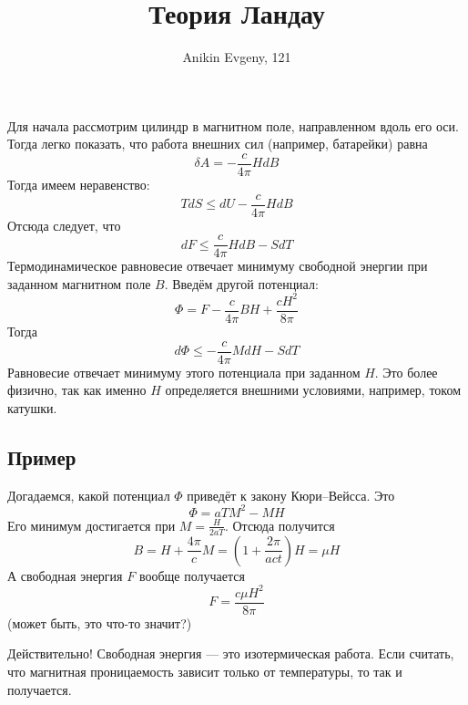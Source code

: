 \documentclass{article}
\title{Теория Ландау}
\author{Anikin Evgeny, 121}
\begin{document}
\maketitle
\section{}
Для начала рассмотрим цилиндр в магнитном поле, направленном вдоль его оси.
Тогда легко показать, что работа внешних сил (например, батарейки) равна
	\begin{equation}
		\delta A = -\frac{c}{4\pi} HdB
	\end{equation}
Тогда имеем неравенство:
	\begin{equation}
		TdS \le dU - \frac{c}{4\pi} HdB 
	\end{equation}
Отсюда следует, что
	\begin{equation}
		dF \le \frac{c}{4\pi} H dB - S dT
	\end{equation}
Термодинамическое равновесие отвечает минимуму свободной энергии при заданном магнитном поле
$B$.
Введём другой потенциал:
	\begin{equation}
		\Phi = F - \frac{c}{4\pi} BH + \frac{cH^2}{8\pi}
	\end{equation}
Тогда
	\begin{equation}
		d \Phi \le -\frac{c}{4\pi} MdH - SdT
	\end{equation}
Равновесие отвечает минимуму этого потенциала при заданном $H$. Это более физично, так как
именно $H$ определяется внешними условиями, например, током катушки.

\subsection{Пример}
Догадаемся, какой потенциал $\Phi$ приведёт к закону Кюри--Вейсса. Это
\begin{equation}
	\Phi = aTM^2 - MH
\end{equation}
Его минимум достигается при $M = \frac{H}{2aT}$. Отсюда получится
\begin{equation}
	B = H + \frac{4\pi}{c}M = \left(1 + \frac{2\pi}{act}\right)H = \mu H
\end{equation}
А свободная энергия $F$ вообще получается
\begin{equation}
	F = \frac{c\mu H^2}{8\pi}
\end{equation}
(может быть, это что-то значит?)
	
Действительно! Свободная энергия --- это изотермическая работа. Если
считать, что магнитная проницаемость зависит только от температуры, то так 
и получается.
\end{document}

